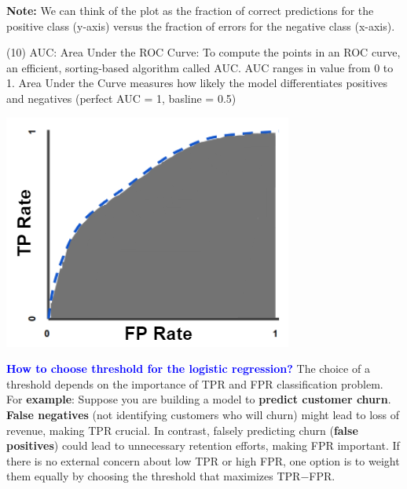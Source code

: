 \documentclass[letterpaper, 10.5pt,landscape]{article}
\begin{document}
\begin{multicols*}{3}
\vspace{-5pt}

\textbf{Note:} We can think of the plot as the fraction of correct predictions for the positive class (y-axis) versus the fraction of errors for the negative class (x-axis).

\vspace{2pt}

(10) AUC: Area Under the ROC Curve: To compute the points in an ROC curve, an efficient, sorting-based algorithm called AUC. AUC ranges in value from 0 to 1. Area Under the Curve measures how likely the model differentiates positives and negatives (perfect AUC = 1, basline = 0.5) 

\vspace{-5pt}

\begin{center}
    \begin{minipage}{0.55\linewidth}
        \includegraphics[width=\textwidth]{figures/AUC_ROC.PNG}
    \end{minipage}
\end{center}
\vspace{-5pt}



\textbf{\textcolor{blue}{How to choose threshold for the logistic regression?}}
The choice of a threshold depends on the importance of TPR and FPR classification problem. For \textbf{example}: Suppose you are building a model to \textbf{predict customer churn}. \textbf{False negatives} (not identifying customers who will churn) might lead to loss of revenue, making TPR crucial. In contrast, falsely predicting churn (\textbf{false positives}) could lead to unnecessary retention efforts, making FPR important. If there is no external concern about low TPR or high FPR, one option is to weight them equally by choosing the threshold that maximizes TPR$-$FPR.


\end{multicols*}
\end{document}
